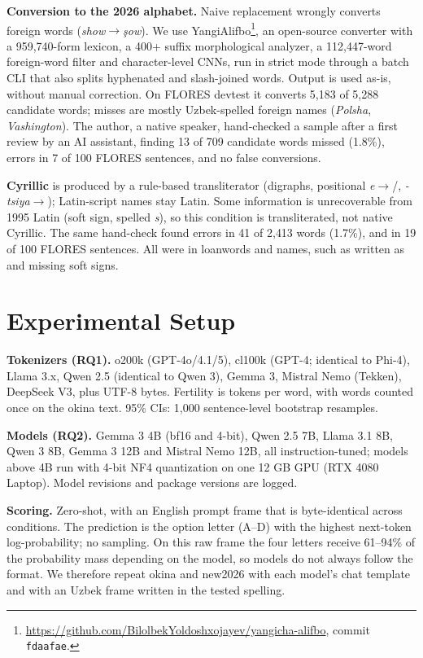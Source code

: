 \textbf{Conversion to the 2026 alphabet.} Naive replacement wrongly converts foreign words (\emph{show}$\to$\emph{\c{s}ow}). We use YangiAlifbo\footnote{\url{https://github.com/BilolbekYoldoshxojayev/yangicha-alifbo}, commit \texttt{fdaafae}.}, an open-source converter with a 959{,}740-form lexicon, a 400+ suffix morphological analyzer, a 112{,}447-word foreign-word filter and character-level CNNs, run in strict mode through a batch CLI that also splits hyphenated and slash-joined words. Output is used as-is, without manual correction. On FLORES devtest it converts 5{,}183 of 5{,}288 candidate words; misses are mostly Uzbek-spelled foreign names (\emph{Polsha}, \emph{Vashington}). The author, a native speaker, hand-checked a sample after a first review by an AI assistant, finding 13 of 709 candidate words missed (1.8\%), errors in 7 of 100 FLORES sentences, and no false conversions.

\textbf{Cyrillic} is produced by a rule-based transliterator (digraphs, positional \emph{e}$\to$/, \emph{-tsiya}$\to$); Latin-script names stay Latin. Some information is unrecoverable from 1995 Latin (soft sign,  spelled \emph{s}), so this condition is transliterated, not native Cyrillic. The same hand-check found errors in 41 of 2{,}413 words (1.7\%), and in 19 of 100 FLORES sentences. All were in loanwords and names, such as  written as  and missing soft signs.

\section{Experimental Setup}
\textbf{Tokenizers (RQ1).} o200k (GPT-4o/4.1/5), cl100k (GPT-4; identical to Phi-4), Llama 3.x, Qwen 2.5 (identical to Qwen 3), Gemma 3, Mistral Nemo (Tekken), DeepSeek V3, plus UTF-8 bytes. Fertility is tokens per word, with words counted once on the okina text. 95\% CIs: 1{,}000 sentence-level bootstrap resamples.

\textbf{Models (RQ2).} Gemma 3 4B (bf16 and 4-bit), Qwen 2.5 7B, Llama 3.1 8B, Qwen 3 8B, Gemma 3 12B and Mistral Nemo 12B, all instruction-tuned; models above 4B run with 4-bit NF4 quantization \citep{dettmers2023qlora} on one 12 GB GPU (RTX 4080 Laptop). Model revisions and package versions are logged.

\textbf{Scoring.} Zero-shot, with an English prompt frame that is byte-identical across conditions. The prediction is the option letter (A--D) with the highest next-token log-probability; no sampling. On this raw frame the four letters receive 61--94\% of the probability mass depending on the model, so models do not always follow the format. We therefore repeat okina and new2026 with each model's chat template and with an Uzbek frame written in the tested spelling.

